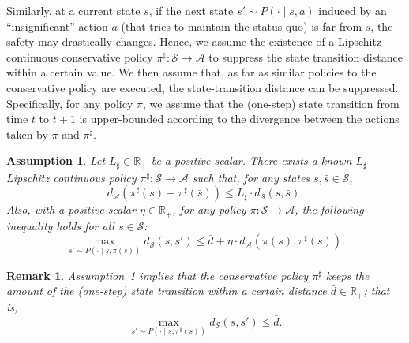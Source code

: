 \documentclass[letterpaper]{article} %
\newtheorem{assumption}{Assumption}
\newtheorem{remark}{Remark}
\newcommand{\R}{\mathbb{R}}
\newcommand{\cA}{\mathcal{A}}
\newcommand{\cS}{\mathcal{S}}
\begin{document}
Similarly, at a current state $s$, if the next state $s' \sim P(\cdot \mid s, a)$ induced by an ``insignificant'' action $a$ (that tries to maintain the status quo) is far from $s$, the safety may drastically changes.
Hence, we assume the existence of a Lipschitz-continuous conservative policy $\pi^\sharp: \cS \rightarrow \cA$ to suppress the state transition distance within a certain value.
We then assume that, as far as similar policies to the conservative policy are executed, the state-transition distance can be suppressed.
Specifically, for any policy $\pi$, we assume that the (one-step) state transition from time $t$ to $t+1$ is upper-bounded according to the divergence between the actions taken by $\pi$ and $\pi^\sharp$.
%
\begin{assumption}
    \label{assumption:stabilizing}
    Let $L_\sharp \in \R_+$ be a positive scalar.
    There exists a known $L_\sharp$-Lipschitz continuous policy $\pi^\sharp: \cS \rightarrow \cA$ such that, for any states $s, \bar{s} \in \cS$,
    \begin{equation}
        d_\cA(\pi^\sharp(s) - \pi^\sharp(\bar{s})) \le L_\sharp \cdot d_\cS(s, \bar{s}).
    \end{equation}
    Also, with a positive scalar $\eta \in \R_{+}$, for any policy $\pi: \cS \rightarrow \cA$, the following inequality holds for all $s \in \cS$:
    \begin{equation*}
        \max_{s' \sim P(\cdot \mid s, \pi(s))} d_\cS(s, s') \le \bar{d} + \eta \cdot d_\cA(\pi(s), \pi^\sharp(s)).
    \end{equation*}
\end{assumption}

\begin{remark}
    Assumption~\ref{assumption:stabilizing} implies that the conservative policy $\pi^\sharp$ keeps the amount of the (one-step) state transition within a certain distance $\bar{d} \in \R_{+}$; that is,
    \begin{equation*}
        \max_{s' \sim P(\cdot \mid s, \pi^\sharp(s))} d_\cS(s, s') \le \bar{d}.
    \end{equation*}
\end{remark}
\end{document}
